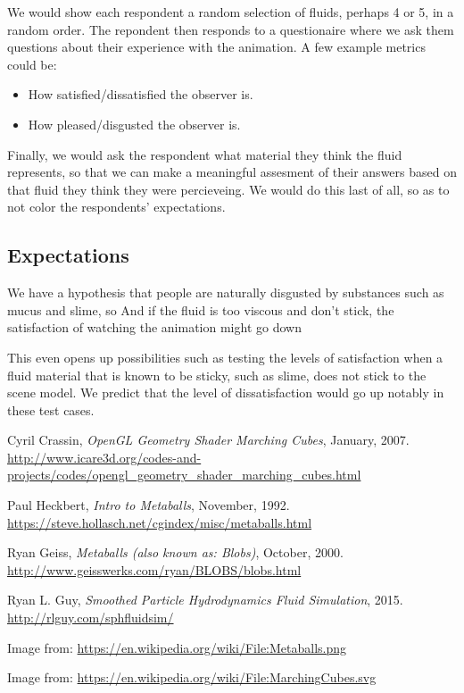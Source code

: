 \documentclass{article}
\begin{document}
\begin{multicols}{2}
            We would show each respondent a random selection of fluids, perhaps 4 or 5, in a random order. The repondent then responds to a questionaire where we ask them questions about their experience with the animation. A few example metrics could be:
            
            \begin{itemize}
                \item How satisfied/dissatisfied the observer is.
                \item How pleased/disgusted the observer is.
            \end{itemize}
            
            Finally, we would ask the respondent what material they think the fluid represents, so that we can make a meaningful assesment of their answers based on that fluid they think they were percieveing. We would do this last of all, so as to not color the respondents' expectations.

        \subsection{Expectations}

            We have a hypothesis that people are naturally disgusted by substances such as mucus and slime, so 
            And if the fluid is too viscous and don't stick, the satisfaction of watching the animation might go down

            This even opens up possibilities such as testing the levels of satisfaction when a fluid material that is known to be sticky, such as slime, does not stick to the scene model. We predict that the level of dissatisfaction would go up notably in these test cases.

	\end{multicols}

\begin{thebibliography}{9}

	Cyril Crassin,
	\textit{OpenGL Geometry Shader Marching Cubes},
	January,
	2007.
	\\
	\url{http://www.icare3d.org/codes-and-projects/codes/opengl_geometry_shader_marching_cubes.html}

	Paul Heckbert,
	\textit{Intro to Metaballs},
	November,
	1992.
	\\
	\url{https://steve.hollasch.net/cgindex/misc/metaballs.html}
	
	Ryan Geiss,
	\textit{Metaballs (also known as: Blobs)},
	October,
	2000.
	\\
	\url{http://www.geisswerks.com/ryan/BLOBS/blobs.html}

	Ryan L. Guy,
	\textit{Smoothed Particle Hydrodynamics Fluid Simulation},
	2015.
	\\
	\url{http://rlguy.com/sphfluidsim/}

	Image from: \url{https://en.wikipedia.org/wiki/File:Metaballs.png}

  Image from: \url{https://en.wikipedia.org/wiki/File:MarchingCubes.svg}

\end{thebibliography}
\end{document}

